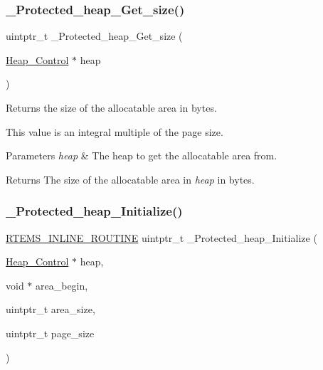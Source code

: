 \subsubsection{\texorpdfstring{\_Protected\_heap\_Get\_size()}{\_Protected\_heap\_Get\_size()}}
{\footnotesize\ttfamily uintptr\+\_\+t \+\_\+\+Protected\+\_\+heap\+\_\+\+Get\+\_\+size (\begin{DoxyParamCaption}\item[{\mbox{\hyperlink{structHeap__Control}{Heap\+\_\+\+Control}} $\ast$}]{heap }\end{DoxyParamCaption})}



Returns the size of the allocatable area in bytes. 

This value is an integral multiple of the page size.


\begin{DoxyParams}{Parameters}
{\em heap} & The heap to get the allocatable area from.\\
\hline
\end{DoxyParams}
\begin{DoxyReturn}{Returns}
The size of the allocatable area in {\itshape heap} in bytes. 
\end{DoxyReturn}
\mbox{\label{group__RTEMSScoreProtHeap_ga0f09fcdd50fcb5de78cdb10c0cb3b7e5}} 
\subsubsection{\texorpdfstring{\_Protected\_heap\_Initialize()}{\_Protected\_heap\_Initialize()}}
{\footnotesize\ttfamily \mbox{\hyperlink{group__RTEMSScoreBaseDefs_gac216239df231d5dbd15e3520b0b9313f}{R\+T\+E\+M\+S\+\_\+\+I\+N\+L\+I\+N\+E\+\_\+\+R\+O\+U\+T\+I\+NE}} uintptr\+\_\+t \+\_\+\+Protected\+\_\+heap\+\_\+\+Initialize (\begin{DoxyParamCaption}\item[{\mbox{\hyperlink{structHeap__Control}{Heap\+\_\+\+Control}} $\ast$}]{heap,  }\item[{void $\ast$}]{area\+\_\+begin,  }\item[{uintptr\+\_\+t}]{area\+\_\+size,  }\item[{uintptr\+\_\+t}]{page\+\_\+size }\end{DoxyParamCaption})}



